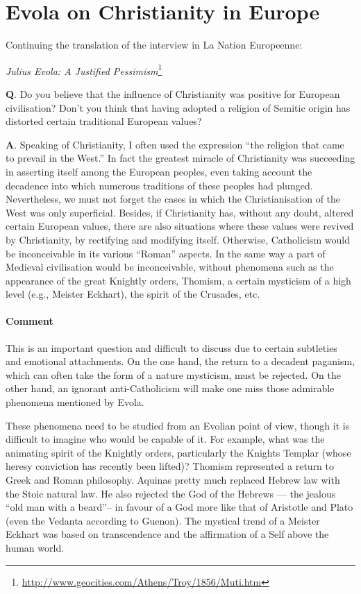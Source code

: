 \section{Evola on Christianity in Europe}

Continuing the translation of the interview in La Nation Europeenne:

\textit{Julius Evola: A Justified Pessimism}\footnote{\url{http://www.geocities.com/Athens/Troy/1856/Muti.htm}}

\textbf{Q}. Do you believe that the influence of Christianity was positive for European civilisation? Don't you think that having adopted a religion of Semitic origin has distorted certain traditional European values?

\textbf{A}. Speaking of Christianity, I often used the expression ``the religion that came to prevail in the West.'' In fact the greatest miracle of Christianity was succeeding in asserting itself among the European peoples, even taking account the decadence into which numerous traditions of these peoples had plunged. Nevertheless, we must not forget the cases in which the Christianisation of the West was only superficial. Besides, if Christianity has, without any doubt, altered certain European values, there are also situations where these values were revived by Christianity, by rectifying and modifying itself. Otherwise, Catholicism would be inconceivable in its various ``Roman'' aspects. In the same way a part of Medieval civilisation would be inconceivable, without phenomena such as the appearance of the great Knightly orders, Thomism, a certain mysticism of a high level (e.g., Meister Eckhart), the spirit of the Crusades, etc.

\paragraph{Comment}

This is an important question and difficult to discuss due to certain subtleties and emotional attachments. On the one hand, the return to a decadent paganism, which can often take the form of a nature mysticism, must be rejected. On the other hand, an ignorant anti-Catholicism will make one miss those admirable phenomena mentioned by Evola.

These phenomena need to be studied from an Evolian point of view, though it is difficult to imagine who would be capable of it. For example, what was the animating spirit of the Knightly orders, particularly the Knights Templar (whose heresy conviction has recently been lifted)? Thomism represented a return to Greek and Roman philosophy. Aquinas pretty much replaced Hebrew law with the Stoic natural law. He also rejected the God of the Hebrews --- the jealous ``old man with a beard''-- in favour of a God more like that of Aristotle and Plato (even the Vedanta according to Guenon). The mystical trend of a Meister Eckhart was based on transcendence and the affirmation of a Self above the human world.

